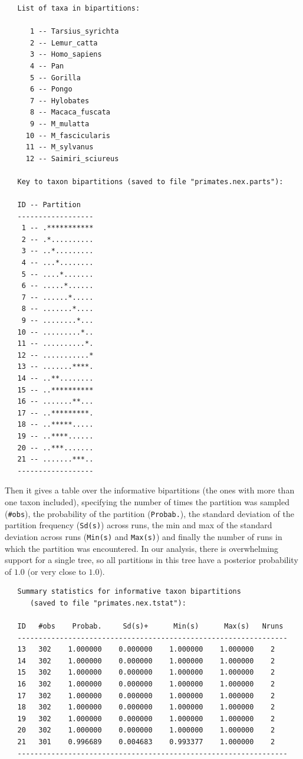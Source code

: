 \documentclass[12pt]{book}
\newcommand{\ttt}[1]{\texttt{#1}}
\begin{document}
\begin{singlespacing}
\footnotesize
\begin{verbatim}
   List of taxa in bipartitions:

      1 -- Tarsius_syrichta
      2 -- Lemur_catta
      3 -- Homo_sapiens
      4 -- Pan
      5 -- Gorilla
      6 -- Pongo
      7 -- Hylobates
      8 -- Macaca_fuscata
      9 -- M_mulatta
     10 -- M_fascicularis
     11 -- M_sylvanus
     12 -- Saimiri_sciureus

   Key to taxon bipartitions (saved to file "primates.nex.parts"):

   ID -- Partition
   ------------------
    1 -- .***********
    2 -- .*..........
    3 -- ..*.........
    4 -- ...*........
    5 -- ....*.......
    6 -- .....*......
    7 -- ......*.....
    8 -- .......*....
    9 -- ........*...
   10 -- .........*..
   11 -- ..........*.
   12 -- ...........*
   13 -- .......****.
   14 -- ..**........
   15 -- ..**********
   16 -- .......**...
   17 -- ..*********.
   18 -- ..*****.....
   19 -- ..****......
   20 -- ..***.......
   21 -- .......***..
   ------------------
\end{verbatim}
\normalsize
\end{singlespacing}

Then it gives a table over the informative bipartitions (the ones with more than one taxon
included), specifying the number of times the partition was sampled (\ttt{\#obs}), the probability
of the partition (\ttt{Probab.}), the standard deviation of the partition frequency (\ttt{Sd(s)})
across runs, the min and max of the standard deviation across runs (\ttt{Min(s)} and \ttt{Max(s)})
and finally the number of runs in which the partition was encountered. In our analysis, there is
overwhelming support for a single tree, so all partitions in this tree have a posterior probability
of $1.0$ (or very close to $1.0$).

\begin{singlespacing}
\footnotesize
\begin{verbatim}
   Summary statistics for informative taxon bipartitions
      (saved to file "primates.nex.tstat"):

   ID   #obs    Probab.     Sd(s)+      Min(s)      Max(s)   Nruns 
   ----------------------------------------------------------------
   13   302    1.000000    0.000000    1.000000    1.000000    2
   14   302    1.000000    0.000000    1.000000    1.000000    2
   15   302    1.000000    0.000000    1.000000    1.000000    2
   16   302    1.000000    0.000000    1.000000    1.000000    2
   17   302    1.000000    0.000000    1.000000    1.000000    2
   18   302    1.000000    0.000000    1.000000    1.000000    2
   19   302    1.000000    0.000000    1.000000    1.000000    2
   20   302    1.000000    0.000000    1.000000    1.000000    2
   21   301    0.996689    0.004683    0.993377    1.000000    2
   ----------------------------------------------------------------
\end{verbatim}
\normalsize
\end{singlespacing}
\end{document}
